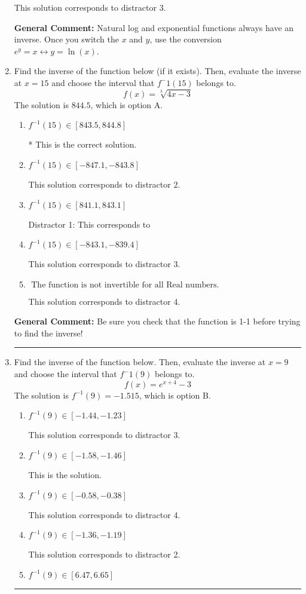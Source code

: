 \documentclass{extbook}[14pt]
\newcommand{\litem}[1]{\item #1

\rule{\textwidth}{0.4pt}}
\begin{document}
\begin{enumerate}
{\begin{enumerate}[label=\Alph*.]
 This solution corresponds to distractor 3.
\end{enumerate}

\textbf{General Comment:} Natural log and exponential functions always have an inverse. Once you switch the $x$ and $y$, use the conversion $ e^y = x \leftrightarrow y=\ln(x)$.
}
\litem{
Find the inverse of the function below (if it exists). Then, evaluate the inverse at $x = 15$ and choose the interval that $f^-1(15)$ belongs to.
\[ f(x) = \sqrt[3]{4 x - 3} \]The solution is \( 844.5 \), which is option A.\begin{enumerate}[label=\Alph*.]
\item \( f^{-1}(15) \in [843.5, 844.8] \)

* This is the correct solution.
\item \( f^{-1}(15) \in [-847.1, -843.8] \)

 This solution corresponds to distractor 2.
\item \( f^{-1}(15) \in [841.1, 843.1] \)

 Distractor 1: This corresponds to 
\item \( f^{-1}(15) \in [-843.1, -839.4] \)

 This solution corresponds to distractor 3.
\item \( \text{ The function is not invertible for all Real numbers. } \)

 This solution corresponds to distractor 4.
\end{enumerate}

\textbf{General Comment:} Be sure you check that the function is 1-1 before trying to find the inverse!
}
\litem{
Find the inverse of the function below. Then, evaluate the inverse at $x = 9$ and choose the interval that $f^-1(9)$ belongs to.
\[ f(x) = e^{x+4}-3 \]The solution is \( f^{-1}(9) = -1.515 \), which is option B.\begin{enumerate}[label=\Alph*.]
\item \( f^{-1}(9) \in [-1.44, -1.23] \)

 This solution corresponds to distractor 3.
\item \( f^{-1}(9) \in [-1.58, -1.46] \)

 This is the solution.
\item \( f^{-1}(9) \in [-0.58, -0.38] \)

 This solution corresponds to distractor 4.
\item \( f^{-1}(9) \in [-1.36, -1.19] \)

 This solution corresponds to distractor 2.
\item \( f^{-1}(9) \in [6.47, 6.65] \)


\end{enumerate}}
\end{enumerate}
\end{document}
